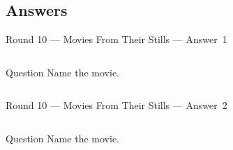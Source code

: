 \documentclass[11pt]{beamer}
\begin{document}
\subsection{Answers}
\begin{frame}[t]{Round 10 --- Movies From Their Stills --- \mbox{Answer 1}}
    \vspace{-0.5em}
    \begin{columns}[T,totalwidth=\linewidth]
        \begin{column}{0.32\linewidth}
            \begin{block}{Question}
                Name the movie.
            \end{block}
        \end{column}
        \begin{column}{0.65\linewidth}
            \begin{center}
                \texttt{[image: \{Images/walter]}.jpg}
            \end{center}
        \end{column}
    \end{columns}
\end{frame}
\begin{frame}[t]{Round 10 --- Movies From Their Stills --- \mbox{Answer 2}}
    \vspace{-0.5em}
    \begin{columns}[T,totalwidth=\linewidth]
        \begin{column}{0.32\linewidth}
            \begin{block}{Question}
                Name the movie.
            \end{block}
        \end{column}
        \begin{column}{0.65\linewidth}
            \begin{center}
                \texttt{[image: \{Images/grapesofwrath]}.jpg}
            \end{center}
        \end{column}
    \end{columns}
\end{frame}
\end{document}
